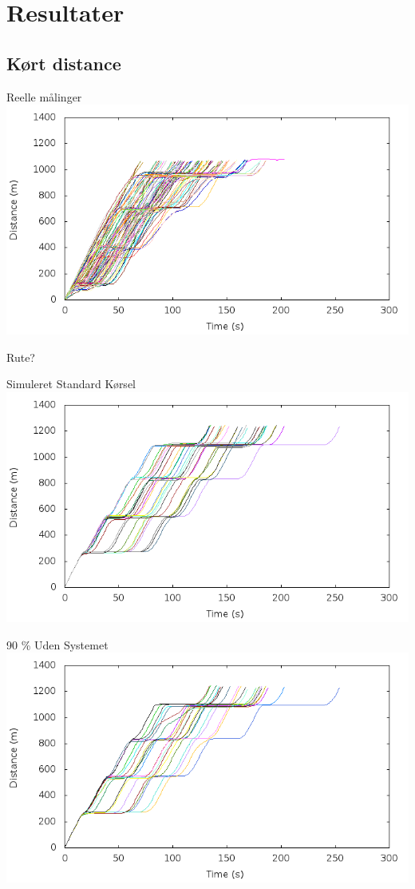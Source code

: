 \section{Resultater}
\subsection{Kørt distance}
\begin{frame}{Reelle målinger}
\includegraphics[width=1\textwidth]{images/RealDistance.png}

Rute?
\end{frame}

\begin{frame}{Simuleret Standard Kørsel}
\includegraphics[width=1\textwidth]{images/distanceUncontrolled0.png}
\end{frame}

\begin{frame}{90 \% Uden Systemet}
\includegraphics[width=1\textwidth]{images/distanceUncontrolled10.png}
\end{frame}

